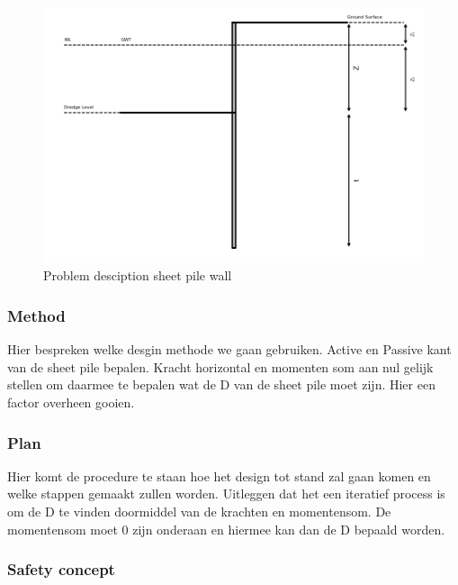 \begin{figure}[H]
    \centering
    \includegraphics[width=0.70\linewidth]{figures/ch8/sketch_profile.png}
    \caption{Problem desciption sheet pile wall}
    \label{fig:problem_description_sheetpiles}
\end{figure}

\subsubsection{Method}

Hier bespreken welke desgin methode we gaan gebruiken. Active en Passive kant van de sheet pile bepalen. Kracht horizontal en momenten som aan nul gelijk stellen om daarmee te bepalen wat de D van de sheet pile moet zijn. Hier een factor overheen gooien. 

\subsubsection{Plan}

Hier komt de procedure te staan hoe het design tot stand zal gaan komen en welke stappen gemaakt zullen worden. Uitleggen dat het een iteratief process is om de D te vinden doormiddel van de krachten en momentensom. De momentensom moet 0 zijn onderaan en hiermee kan dan de D bepaald worden. \textbf{}

\subsubsection{Safety concept}

